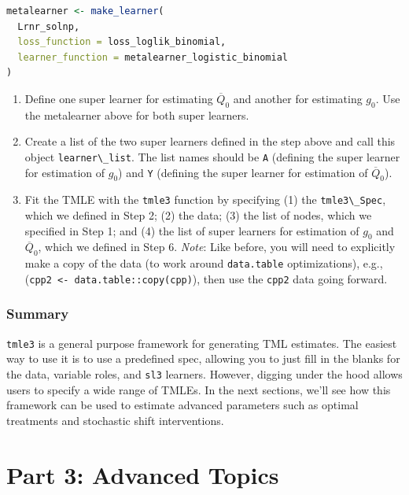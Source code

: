 \documentclass[
  12pt, krantz2,
]{krantz}
\newcommand{\passthrough}[1]{#1}
\providecommand{\tightlist}{%
  \setlength{\itemsep}{0pt}\setlength{\parskip}{0pt}}
\newcommand{\1}{\mathbbm{1}}
\theoremstyle{definition}
\theoremstyle{definition}
\theoremstyle{definition}
\theoremstyle{definition}
\theoremstyle{remark}
\begin{document}
\begin{lstlisting}[language=R]
metalearner <- make_learner(
  Lrnr_solnp,
  loss_function = loss_loglik_binomial,
  learner_function = metalearner_logistic_binomial
)
\end{lstlisting}

\begin{enumerate}
\def\labelenumi{\arabic{enumi}.}
\setcounter{enumi}{4}
\tightlist
\item
  Define one super learner for estimating \(\overline{Q}_0\) and another for
  estimating \(g_0\). Use the metalearner above for both super learners.
\item
  Create a list of the two super learners defined in the step above and call
  this object \passthrough{\lstinline!learner\_list!}. The list names should be \passthrough{\lstinline!A!} (defining the super
  learner for estimation of \(g_0\)) and \passthrough{\lstinline!Y!} (defining the super learner for
  estimation of \(\overline{Q}_0\)).
\item
  Fit the TMLE with the \passthrough{\lstinline!tmle3!} function by specifying (1) the \passthrough{\lstinline!tmle3\_Spec!},
  which we defined in Step 2; (2) the data; (3) the list of nodes, which we
  specified in Step 1; and (4) the list of super learners for estimation of
  \(g_0\) and \(\overline{Q}_0\), which we defined in Step 6. \emph{Note}: Like before,
  you will need to explicitly make a copy of the data (to work around
  \passthrough{\lstinline!data.table!} optimizations), e.g., (\passthrough{\lstinline!cpp2 <- data.table::copy(cpp)!}), then
  use the \passthrough{\lstinline!cpp2!} data going forward.
\end{enumerate}

\hypertarget{summary-1}{%
\section{Summary}\label{summary-1}}

\passthrough{\lstinline!tmle3!} is a general purpose framework for generating TML estimates. The easiest
way to use it is to use a predefined spec, allowing you to just fill in the
blanks for the data, variable roles, and \passthrough{\lstinline!sl3!} learners. However, digging under
the hood allows users to specify a wide range of TMLEs. In the next sections,
we'll see how this framework can be used to estimate advanced parameters such as
optimal treatments and stochastic shift interventions.

\hypertarget{part-part-3-advanced-topics}{%
\part{Part 3: Advanced Topics}\label{part-part-3-advanced-topics}}
\end{document}
